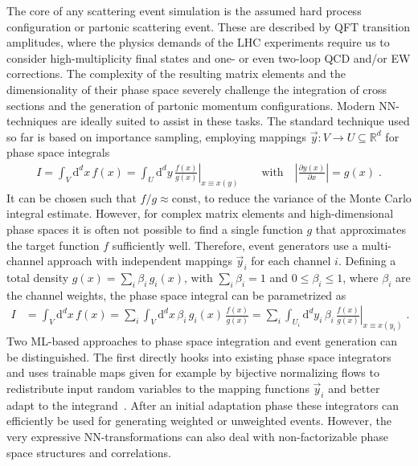 \documentclass[submission,Phys]{SciPost}
\begin{document}
The core of any scattering event simulation is the assumed hard process configuration or partonic scattering event. These are described by QFT transition amplitudes, where the physics demands of the LHC experiments require us to consider high-multiplicity final states and one- or even two-loop QCD and/or EW corrections. The complexity of the resulting matrix elements and the dimensionality of their phase space severely challenge the integration of cross sections and the generation of partonic momentum configurations. Modern NN-techniques are ideally suited to assist in these tasks. The standard technique used so far is based on importance sampling, employing mappings $\vec{y}:V\to U \subseteq \mathbb{R}^d$ for phase space integrals 
%
\begin{align}
I = \int_V\mathrm{d}^dx\,f(x)=\int_U\mathrm{d}^dy\,\left.\frac{f(x)}{g(x)}\right\vert_{x\equiv x(y)} \qquad \text{with} \quad
\left\vert\frac{\partial y(x)}{\partial x}\right\vert=g(x)\; .
\end{align}
%
It can be chosen such that $f/g\approx \text{const}$, to reduce the variance of the Monte Carlo integral estimate. However, for complex matrix elements and high-dimensional phase spaces it is often not possible to find a single function $g$ that approximates the target function $f$ sufficiently well. Therefore, event generators use a multi-channel approach with independent mappings $\vec{y}_i$ for each channel $i$. Defining a total density $g(x) = \sum_i \beta_i\,g_i(x)$, with $\sum_i \beta_i = 1$ and $0\le\beta_i\le1$, where $\beta_i$ are the channel weights, the phase space integral can be parametrized as
%
\begin{align}
    I &= \int_V\mathrm{d}^d x\,f(x)
    =\sum_i \int_V\mathrm{d}^d x\,\beta_i\,g_i(x)\,\frac{f(x)}{g(x)}
    =\sum_i\int_{U_i}\mathrm{d}^d y_i\,\beta_i\,\left.\frac{f(x)}{g(x)}\right\vert_{x\equiv x(y_i)}\; .
    \label{eq:multi-channel-standard}
\end{align}
%
Two ML-based approaches to phase space integration and event generation can be distinguished. The first directly hooks into existing phase space integrators and uses trainable maps given for example by bijective normalizing flows to redistribute input random variables to the mapping functions $\vec{y}_i$ and better adapt to the integrand~\cite{bendavid,Klimek:2018mza,Bothmann:2020ywa,Gao:2020vdv,Gao:2020zvv,Chen:2020nfb,Pina-Otey:2020hzm}. After an initial adaptation phase these integrators can efficiently be used for generating weighted or unweighted events. However, the very expressive NN-transformations can also deal with non-factorizable phase space structures and correlations.
\end{document}

